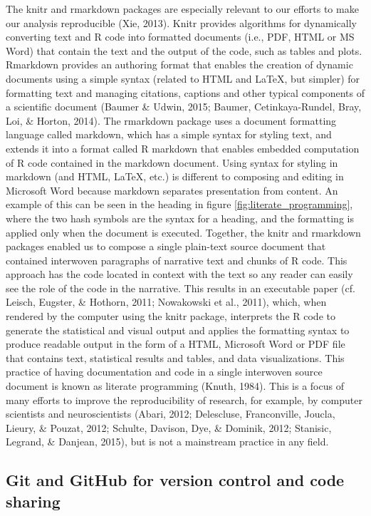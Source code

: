 \documentclass[american,man]{apa6}
\newcounter{author}
\begin{document}
The knitr and rmarkdown packages are especially relevant to our efforts
to make our analysis reproducible (Xie, 2013). Knitr provides algorithms
for dynamically converting text and R code into formatted documents
(i.e., PDF, HTML or MS Word) that contain the text and the output of the
code, such as tables and plots. Rmarkdown provides an authoring format
that enables the creation of dynamic documents using a simple syntax
(related to HTML and LaTeX, but simpler) for formatting text and
managing citations, captions and other typical components of a
scientific document (Baumer \& Udwin, 2015; Baumer, Cetinkaya-Rundel,
Bray, Loi, \& Horton, 2014). The rmarkdown package uses a document
formatting language called markdown, which has a simple syntax for
styling text, and extends it into a format called R markdown that
enables embedded computation of R code contained in the markdown
document. Using syntax for styling in markdown (and HTML, LaTeX, etc.)
is different to composing and editing in Microsoft Word because markdown
separates presentation from content. An example of this can be seen in
the heading in figure \ref{fig:literate_programming}, where the two hash
symbols are the syntax for a heading, and the formatting is applied only
when the document is executed. Together, the knitr and rmarkdown
packages enabled us to compose a single plain-text source document that
contained interwoven paragraphs of narrative text and chunks of R code.
This approach has the code located in context with the text so any
reader can easily see the role of the code in the narrative. This
results in an executable paper (cf. Leisch, Eugster, \& Hothorn, 2011;
Nowakowski et al., 2011), which, when rendered by the computer using the
knitr package, interprets the R code to generate the statistical and
visual output and applies the formatting syntax to produce readable
output in the form of a HTML, Microsoft Word or PDF file that contains
text, statistical results and tables, and data visualizations. This
practice of having documentation and code in a single interwoven source
document is known as literate programming (Knuth, 1984). This is a focus
of many efforts to improve the reproducibility of research, for example,
by computer scientists and neuroscientists (Abari, 2012; Delescluse,
Franconville, Joucla, Lieury, \& Pouzat, 2012; Schulte, Davison, Dye, \&
Dominik, 2012; Stanisic, Legrand, \& Danjean, 2015), but is not a
mainstream practice in any field.

\subsection{Git and GitHub for version control and code
sharing}\label{git-and-github-for-version-control-and-code-sharing}
\end{document}
